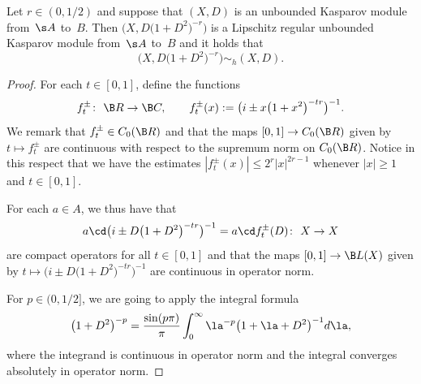 \begin{prop}\label{p:liphom}Let $r \in (0,1/2)$ and suppose that $(X,D)$ is an unbounded Kasparov module from~$\s A$ to~$B$. Then $\big(X,D\big(1 + D^2\big)^{-r}\big)$ is a Lipschitz regular unbounded Kasparov module from~$\s A$ to~$B$ and it holds that
\[
\big(X, D\big(1 + D^2\big)^{-r}\big) \sim_h (X,D) .
\]
\end{prop}
\begin{proof}For each $t \in [0,1]$, define the functions
\[
f_t^{\pm}\colon \ \B R \to \B C, \qquad f_t^{\pm}(x) := \big( i \pm x \big(1 + x^2\big)^{-tr} \big)^{-1} .
\]
We remark that $f_t^{\pm} \in C_0( \B R )$ and that the maps $[0,1] \to C_0(\B R)$ given by $t \mapsto f_t^{\pm}$ are continuous with respect to the supremum norm on $C_0( \B R)$. Notice in this respect that we have the estimates $| f_t^{\pm}(x) | \leq 2^r |x|^{2r - 1}$ whenever $|x| \geq 1$ and $t \in [0,1]$.

For each $a \in A$, we thus have that
\[
a \cd \big(i \pm D\big(1 + D^2\big)^{-tr}\big)^{-1} = a \cd f_t^{\pm}(D)\colon \ X \to X
\]
are compact operators for all $t \in [0,1]$ and that the maps $[0,1] \to \B L(X)$ given by $t \mapsto \big(i \pm D\big(1 + D^2\big)^{-tr}\big)^{-1}$ are continuous in operator norm.

For $p \in (0,1/2]$, we are going to apply the integral formula
\begin{gather}\label{eq:intpow}
\big(1 + D^2\big)^{-p} = \frac{\sin(p \pi)}{\pi} \int_0^\infty \la^{-p} \big(1 + \la + D^2\big)^{-1} d\la ,
\end{gather}
where the integrand is continuous in operator norm and the integral converges absolutely in operator norm.


\end{proof}
